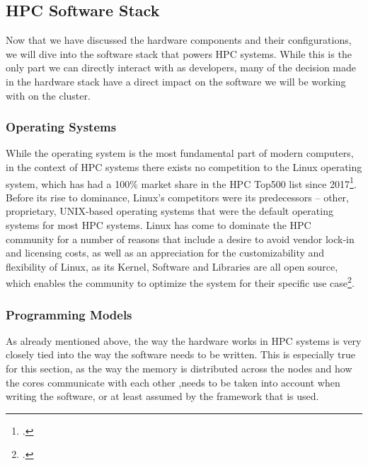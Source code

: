 

\subsection{HPC Software Stack}

Now that we have discussed the hardware components and their configurations, we will dive into the software stack that powers \ac{HPC} systems.
While this is the only part we can directly interact with as developers, many of the decision made in the hardware stack have a direct impact on
the software we will be working with on the cluster.


\subsubsection{Operating Systems}
\label{sec:operating_systems}

While the operating system is the most fundamental part of modern computers, in the context of \ac{HPC} systems there exists no competition to the Linux operating system,
which has had a 100\% market share in the \ac{HPC} Top500 list since 2017\footcite{top500OperatinststemsDevelopmentTime}.
Before its rise to dominance, Linux's competitors were its predecessors -- other, proprietary, UNIX-based operating systems that were
the default operating systems for most \ac{HPC} systems.
Linux has come to dominate the \ac{HPC} community for a number of reasons that include a desire to avoid vendor lock-in and licensing costs,
as well as an appreciation for the customizability and flexibility of Linux,
as its Kernel, Software and Libraries are all open source, which enables the community to optimize the system for their specific use case\footcite{rohitguptaLinuxOperatingSystem}.


\subsubsection{Programming Models}
\label{sec:programming_models}
As already mentioned above, the way the hardware works in \ac{HPC} systems is very closely tied into the way the software needs to be written.
This is especially true for this section, as the way the memory is distributed across the nodes and how the cores communicate with each other
,needs to be taken into account when writing the software, or at least assumed by the framework that is used.


